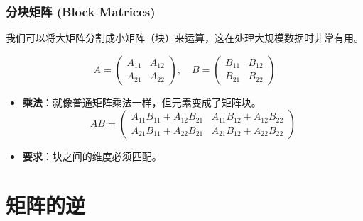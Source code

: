 \begin{frame}
\frametitle{分块矩阵 (Block Matrices)}

我们可以将大矩阵分割成小矩阵（块）来运算，这在处理大规模数据时非常有用。

\[
A = \begin{pmatrix} A_{11} & A_{12} \\ A_{21} & A_{22} \end{pmatrix}, \quad
B = \begin{pmatrix} B_{11} & B_{12} \\ B_{21} & B_{22} \end{pmatrix}
\]

\begin{itemize}
    \item \textbf{乘法}：就像普通矩阵乘法一样，但元素变成了矩阵块。
    \[
    AB = \begin{pmatrix} A_{11}B_{11}+A_{12}B_{21} & A_{11}B_{12}+A_{12}B_{22} \\ A_{21}B_{11}+A_{22}B_{21} & A_{21}B_{12}+A_{22}B_{22} \end{pmatrix}
    \]
    \item \textbf{要求}：块之间的维度必须匹配。
\end{itemize}

\end{frame}


\section{矩阵的逆}


